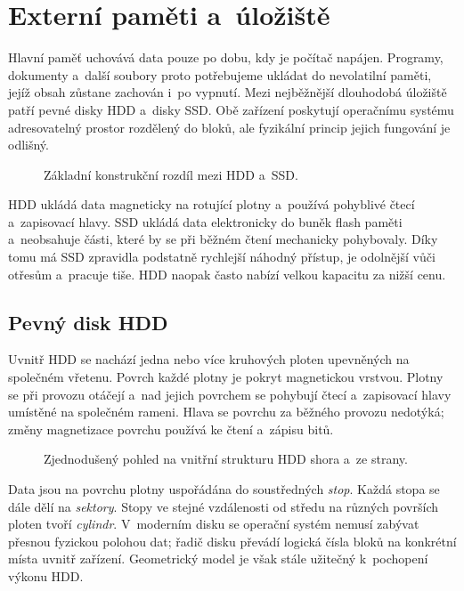 \section{Externí paměti a~úložiště}\label{sec:hw-externi-pameti}

Hlavní paměť uchovává data pouze po dobu, kdy je počítač napájen. Programy, dokumenty a~další soubory proto potřebujeme ukládat do nevolatilní paměti, jejíž obsah zůstane zachován i~po vypnutí. Mezi nejběžnější dlouhodobá úložiště patří pevné disky HDD a~disky SSD. Obě zařízení poskytují operačnímu systému adresovatelný prostor rozdělený do bloků, ale fyzikální princip jejich fungování je odlišný.

\begin{figure}[ht]
    \centering
    
    \caption{Základní konstrukční rozdíl mezi HDD a~SSD.}
    \label{fig:hw-hdd-ssd}
\end{figure}

HDD ukládá data magneticky na rotující plotny a~používá pohyblivé čtecí a~zapisovací hlavy. SSD ukládá data elektronicky do buněk flash paměti a~neobsahuje části, které by se při běžném čtení mechanicky pohybovaly. Díky tomu má SSD zpravidla podstatně rychlejší náhodný přístup, je odolnější vůči otřesům a~pracuje tiše. HDD naopak často nabízí velkou kapacitu za nižší cenu.

\subsection{Pevný disk HDD}\label{subsec:hw-hdd}

Uvnitř HDD se nachází jedna nebo více kruhových ploten upevněných na společném vřetenu. Povrch každé plotny je pokryt magnetickou vrstvou. Plotny se při provozu otáčejí a~nad jejich povrchem se pohybují čtecí a~zapisovací hlavy umístěné na společném rameni. Hlava se povrchu za běžného provozu nedotýká; změny magnetizace povrchu používá ke čtení a~zápisu bitů.

\begin{figure}[ht]
    \centering
    
    \caption{Zjednodušený pohled na vnitřní strukturu HDD shora a~ze strany.}
    \label{fig:hw-hdd-struktura}
\end{figure}

Data jsou na povrchu plotny uspořádána do soustředných \emph{stop}. Každá stopa se dále dělí na \emph{sektory}. Stopy ve stejné vzdálenosti od středu na různých površích ploten tvoří \emph{cylindr}. V~moderním disku se operační systém nemusí zabývat přesnou fyzickou polohou dat; řadič disku převádí logická čísla bloků na konkrétní místa uvnitř zařízení. Geometrický model je však stále užitečný k~pochopení výkonu HDD.

